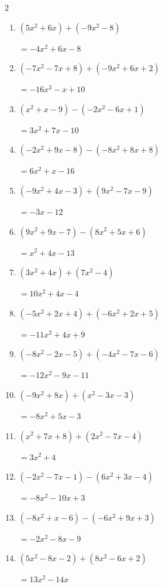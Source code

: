 \begin{multicols}{2}
\begin{enumerate}
        $=-6x^{2}+7x+7$

  \item $(5x^{2}+6x)+(-9x^{2}-8)$

        $=-4x^{2}+6x-8$

  \item $(-7x^{2}-7x+8)+(-9x^{2}+6x+2)$

        $=-16x^{2}-x+10$

  \item $(x^{2}+x-9)-(-2x^{2}-6x+1)$

        $=3x^{2}+7x-10$

  \item $(-2x^{2}+9x-8)-(-8x^{2}+8x+8)$

        $=6x^{2}+x-16$

  \item $(-9x^{2}+4x-3)+(9x^{2}-7x-9)$

        $=-3x-12$

  \item $(9x^{2}+9x-7)-(8x^{2}+5x+6)$

        $=x^{2}+4x-13$

  \item $(3x^{2}+4x)+(7x^{2}-4)$

        $=10x^{2}+4x-4$

  \item $(-5x^{2}+2x+4)+(-6x^{2}+2x+5)$

        $=-11x^{2}+4x+9$

  \item $(-8x^{2}-2x-5)+(-4x^{2}-7x-6)$

        $=-12x^{2}-9x-11$

  \item $(-9x^{2}+8x)+(x^{2}-3x-3)$

        $=-8x^{2}+5x-3$

  \item $(x^{2}+7x+8)+(2x^{2}-7x-4)$

        $=3x^{2}+4$

  \item $(-2x^{2}-7x-1)-(6x^{2}+3x-4)$

        $=-8x^{2}-10x+3$

  \item $(-8x^{2}+x-6)-(-6x^{2}+9x+3)$

        $=-2x^{2}-8x-9$

  \item $(5x^{2}-8x-2)+(8x^{2}-6x+2)$

        $=13x^{2}-14x$


\end{enumerate}
\end{multicols}
